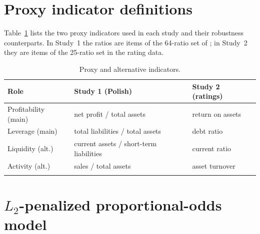 \documentclass[pdflatex,sn-mathphys-ay]{sn-jnl}
\begin{document}
\begin{appendices}

\section{Proxy indicator definitions}\label{app:indicators}

Table~\ref{tab:defs} lists the two proxy indicators used in each study and their robustness
counterparts. In Study~1 the ratios are items of the 64-ratio set of \citet{zieba2016}; in Study~2 they
are items of the 25-ratio set in the rating data.

\begin{table}[h]
\centering
\caption{Proxy and alternative indicators.}
\label{tab:defs}
\begin{tabular}{@{}lll@{}}
\toprule
Role & Study 1 (Polish) & Study 2 (ratings) \\
\midrule
Profitability (main) & net profit / total assets & return on assets \\
Leverage (main)      & total liabilities / total assets & debt ratio \\
Liquidity (alt.)     & current assets / short-term liabilities & current ratio \\
Activity (alt.)      & sales / total assets & asset turnover \\
\botrule
\end{tabular}
\end{table}

\section{$L_2$-penalized proportional-odds model}\label{app:po}


\end{appendices}
\end{document}
